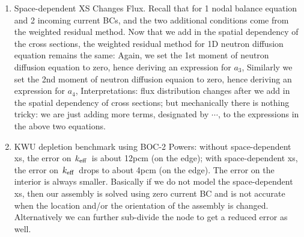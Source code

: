 \documentclass{school-22.211-notes}
\begin{document}
\begin{enumerate}
\item Space-dependent XS Changes Flux. Recall that for 1 nodal balance equation and 2 incoming current BCs, and the two additional conditions come from the weighted residual method. Now that we add in the spatial dependency of the cross sections, the weighted residual method for 1D neutron diffusion equation remains the same: 
Again, we set the 1st moment of neutron diffusion equation to zero, hence deriving an expression for $a_3$, 
Similarly we set the 2nd moment of neutron diffusion equaion to zero, hence deriving an expression for $a_4$, 
Interpretations: flux distribution changes after we add in the spatial dependency of cross sections; but mechanically there is nothing tricky: we are just adding more terms, designated by $\cdots$, to the expressions in the above two equations. 

\item KWU depletion benchmark using BOC-2 Powers: without space-dependent xs, the error on $\left. k_{\mathrm{eff}} \right.$ is about 12pcm (on the edge); with space-dependent xs, the error on $\left. k_{\mathrm{eff}} \right.$ drops to about 4pcm (on the edge). The error on the interior is always smaller. Basically if we do not model the space-dependent xs, then our assembly is solved using zero current BC and is not accurate when the location and/or the orientation of the assembly is changed. Alternatively we can further sub-divide the node to get a reduced error as well. 
\end{enumerate}
\end{document}
